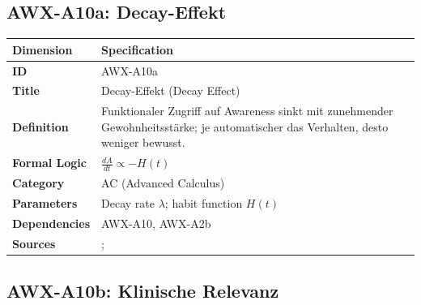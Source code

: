 
\subsection{AWX-A10a: Decay-Effekt}

\begin{table}[htbp]
\small
\begin{tabular}{p{3cm}p{11cm}}
\toprule
\textbf{Dimension} & \textbf{Specification} \\
\midrule
\textbf{ID} & AWX-A10a \\
\textbf{Title} & Decay-Effekt (Decay Effect) \\
\textbf{Definition} & Funktionaler Zugriff auf Awareness sinkt mit zunehmender Gewohnheitsstärke; je automatischer das Verhalten, desto weniger bewusst. \\
\textbf{Formal Logic} & $\frac{dA}{dt} \propto -H(t)$ \\
\textbf{Category} & AC (Advanced Calculus) \\
\textbf{Parameters} & Decay rate $\lambda$; habit function $H(t)$ \\
\textbf{Dependencies} & AWX-A10, AWX-A2b \\
\textbf{Sources} & \citet{charness2009incentives}; \citet{acland2015naivete} \\
\bottomrule
\end{tabular}
\end{table}


\subsection{AWX-A10b: Klinische Relevanz}

